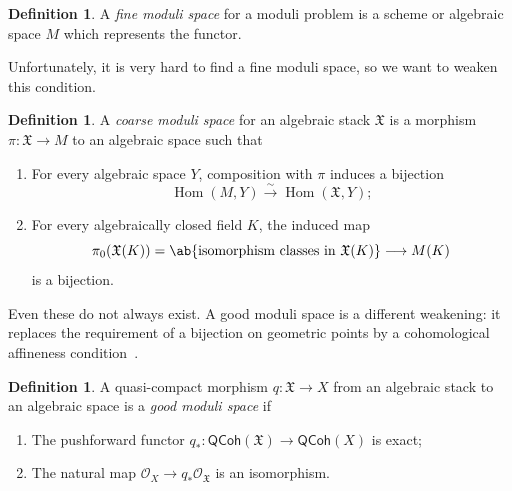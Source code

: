 \documentclass{amsart}
\theoremstyle{definition}
\newtheorem{defn}[thm]{Definition}
\theoremstyle{remark}
\theoremstyle{plain}
\theoremstyle{definition}
\theoremstyle{remark}
\newcommand{\mc}[1]{\mathcal{#1}}
\newcommand{\mf}[1]{\mathfrak{#1}}
\newcommand{\on}[1]{\operatorname{#1}}
\newcommand{\ms}[1]{\mathsf{#1}}
\newcommand{\1}{\mathbf{1}}
\newcommand{\2}{\mathbf{2}}
\newcommand{\3}{\mathbf{3}}
\begin{document}
\begin{defn}
    A \textit{fine moduli space} for a moduli problem is a scheme or algebraic space \(M\) which represents the functor. 
\end{defn}

Unfortunately, it is very hard to find a fine moduli space, so we want to weaken this condition.

\begin{defn}
    A \textit{coarse moduli space} for an algebraic stack \(\mf{X}\) is a morphism \(\pi\colon\mf{X}\to M\) to an algebraic space such that
    \begin{enumerate}
        \item For every algebraic space \(Y\), composition with \(\pi\) induces a bijection
        \[
            \on{Hom}(M,Y)\xrightarrow{\sim}\on{Hom}(\mf{X},Y);
        \]
        \item For every algebraically closed field \(K\), the induced map
        \[
            \pi_0(\mf{X}(K))=\ab\{\text{isomorphism classes in }\mf{X}(K)\}
            \longrightarrow M(K)
        \]
        is a bijection.
    \end{enumerate}
\end{defn}


Even these do not always exist. A good moduli space is a different weakening: it replaces the requirement of a bijection on geometric points by a cohomological affineness condition~\cite{Alper2013}.

\begin{defn}
    A quasi-compact morphism \(q\colon\mf{X}\to X\) from an algebraic stack to an algebraic space is a \textit{good moduli space} if
    \begin{enumerate}
        \item The pushforward functor \(q_*\colon\ms{QCoh}(\mf{X})\to\ms{QCoh}(X)\) is exact;
        \item The natural map \(\mc{O}_X\to q_*\mc{O}_{\mf{X}}\) is an isomorphism.
    \end{enumerate}
\end{defn}
\end{document}
